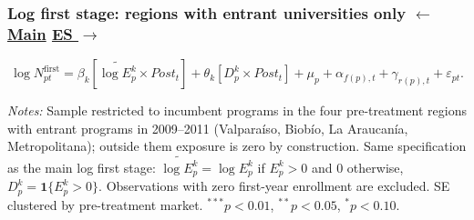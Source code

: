 \documentclass{beamer}
\begin{document}
\begin{frame}[label=sua-fs-log-entrant]

\frametitle{
    Log first stage: regions with entrant universities only
    \hfill
    \hyperlink{sua-log-first-stage}{\scriptsize\color{blue}$\leftarrow$ Main}
    \hyperlink{sua-es-log-entrant}{\scriptsize\color{blue}ES $\rightarrow$}
}

\centering

\vspace{-0.2cm}

{\small
\begin{equation*}
\log N^{\mathrm{first}}_{pt}
=
\beta_k\left[\widetilde{\log E_p^k}\times Post_t\right]
+\theta_k\left[D_p^k\times Post_t\right]
+\mu_p+\alpha_{f(p),t}+\gamma_{r(p),t}+\varepsilon_{pt}.
\end{equation*}
}

\vspace{-0.3cm}

\resizebox{0.62\textwidth}{!}{}

\vspace{0.05cm}

\parbox{0.97\textwidth}{%
\tiny
\textit{Notes:}
Sample restricted to incumbent programs in the four pre-treatment regions with entrant programs in 2009--2011 (Valpara\'iso, Biob\'io, La Araucan\'ia, Metropolitana); outside them exposure is zero by construction.
Same specification as the main log first stage: $\widetilde{\log E_p^k}=\log E_p^k$ if $E_p^k>0$ and 0 otherwise, $D_p^k=\mathbf{1}\{E_p^k>0\}$. Observations with zero first-year enrollment are excluded. SE clustered by pre-treatment market.
$^{***}p<0.01$, $^{**}p<0.05$, $^{*}p<0.10$.
}

\end{frame}
\end{document}
